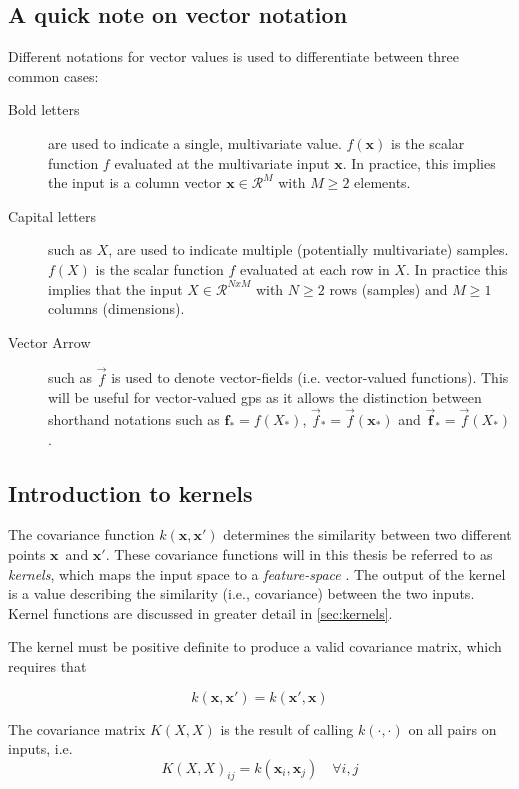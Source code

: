 \subsection{A quick note on vector notation}
Different notations for vector values is used to differentiate between three common cases:
\begin{description}
\item[Bold letters] are used to indicate a single, multivariate value. $f(\boldsymbol{x})$ is the scalar function $f$ evaluated at the multivariate input $\boldsymbol{x}$. In practice, this implies the input is a column vector $\boldsymbol{x} \in \mathcal{R}^{M}$ with $M \geq 2$ elements. 
\item[Capital letters] such as $X$, are used to indicate multiple (potentially multivariate) samples. $f(X)$ is the scalar function $f$ evaluated at each row in $X$. In practice this implies that the input $X \in \mathcal{R}^{N x M}$ with $N \geq 2$ rows (samples) and $M \geq 1$ columns (dimensions).
\item[Vector Arrow] such as $\vec{f}$ is used to denote vector-fields (i.e. vector-valued functions). This will be useful for vector-valued \acrshort{gp}s as it allows the distinction between shorthand notations such as $\boldsymbol{f}_* = f(X_*)$, $\vec{f}_* = \vec{f}(\boldsymbol{x}_*)$ and $\vec{\boldsymbol{f}}_* = \vec{f}(X_*)$.
\end{description}

\subsection{Introduction to kernels}
The covariance function $k(\boldsymbol{x}, \boldsymbol{x}')$ determines the similarity between two different points $\boldsymbol{x}$ and $\boldsymbol{x}'$. These covariance functions will in this thesis be referred to as \textit{kernels}, which maps the input space to a \textit{feature-space} \cite{rasmussen}. The output of the kernel is a value describing the similarity (i.e., covariance) between the two inputs. Kernel functions are discussed in greater detail in \cref{sec:kernels}.

The kernel must be positive definite to produce a valid covariance matrix, which requires that

\begin{equation}
    k(\boldsymbol{x}, \boldsymbol{x}') = k(\boldsymbol{x}', \boldsymbol{x})
\end{equation}

The covariance matrix $K(X, X)$ is the result of calling $k(\cdot, \cdot)$ on all pairs on inputs, i.e.
\begin{equation} 
    K(X, X)_{ij} = k(\boldsymbol{x}_i, \boldsymbol{x}_j) \quad \forall i, j
\end{equation}


